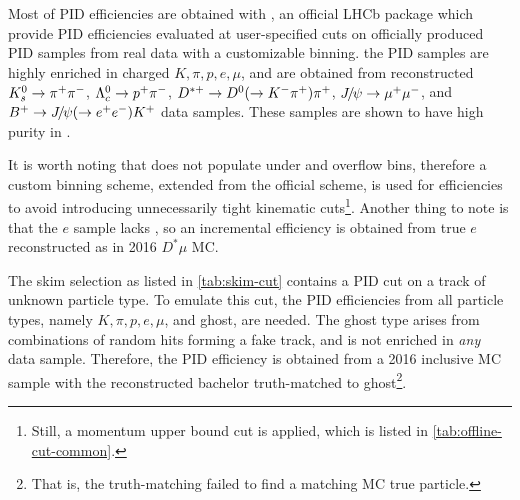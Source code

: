 Most of PID efficiencies are obtained with \pidcalib, an official LHCb package
which provide PID efficiencies evaluated at user-specified cuts on
officially produced PID samples from real data with a customizable binning.
the PID samples are highly enriched in charged $K, \pi, p, e, \mu$, and are
obtained from reconstructed $K_s^0 \rightarrow {\ensuremath{{\pi}^+}} {\ensuremath{{\pi}^-}}$,
$\Lambda_c^0 \rightarrow p^+ {{\pi}^-}$,
${{D}^{*+}} \rightarrow {\ensuremath{{D}^0}} (\rightarrow {\ensuremath{{K}^-}} {\ensuremath{{\pi}^+}}) {{\pi}^+}$,
${{J\mskip -3mu/\mskip -2mu\psi}} \rightarrow {\ensuremath{\mu^+}} {\ensuremath{\mu^-}}$, and
${{{B}^+}} \rightarrow {\ensuremath{{J\mskip -3mu/\mskip -2mu\psi}}} (\rightarrow e^+ e^-) {{K}^+}$ data samples.
These samples are shown to have high purity in \cite{LHCb-DP-2012-003}.

It is worth noting that \pidcalib does not populate under and overflow bins,
therefore a custom binning scheme, extended from the official scheme, is used
for \pidcalib efficiencies to
avoid introducing unnecessarily tight kinematic cuts\footnote{
    Still, a momentum upper bound cut is applied, which is
    listed in \cref{tab:offline-cut-common}.
}.
Another thing to note is that the $e$ sample lacks \UBDT, so an
incremental \UBDT efficiency is obtained from true $e$ reconstructed as \muon
in 2016 $D^*\mu$ MC.

The skim selection as listed in \cref{tab:skim-cut}
contains a  PID cut on a track of unknown particle type.
To emulate this cut, the PID efficiencies from all particle types, namely
$K, \pi, p, e, \mu$, and ghost, are needed.
The ghost type arises from combinations of random hits forming a fake track,
and is not enriched in \emph{any} data sample.
Therefore, the PID efficiency is obtained from a 2016 inclusive \jpsi\muon MC
sample with the reconstructed bachelor \muon truth-matched to ghost\footnote{
    That is, the truth-matching failed to find a matching MC true particle.
}.


